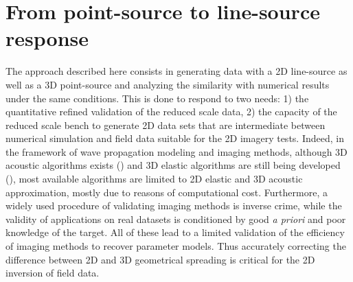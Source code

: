 \documentclass[extra,mreferee]{gji}
\newenvironment{violetnote}{\par\color{BlueViolet}}{\par}
\begin{document}
\begin{violetnote}
\section{From point-source to line-source response}

The approach described here consists in generating data with a 2D line-source as well as a 3D point-source and analyzing the similarity with numerical results under the same conditions. This is done to respond to two needs: 1) the quantitative refined validation of the reduced scale data, 2) the capacity of the reduced scale bench to generate 2D data sets that are intermediate between numerical simulation and field data suitable for the 2D imagery tests. Indeed, in the framework of wave propagation modeling and imaging methods, although 3D acoustic algorithms exists (\cite{benhadjali_FWI_2008,plessix_FWI_2010}) and 3D elastic algorithms are still being developed (\cite{castellanos_AMD_2011,Borisov_FWI_2015}), most available algorithms are limited to 2D elastic and 3D acoustic approximation, mostly due to reasons of computational cost. Furthermore, a widely used procedure of validating imaging methods is inverse crime, while the validity of applications on real datasets is conditioned by good \textit{a priori} and poor knowledge of the target. All of these lead to a limited validation of the efficiency of imaging methods to recover parameter models. Thus accurately correcting the difference between 2D and 3D geometrical spreading is critical for the 2D inversion of field data.


\end{violetnote}
\end{document}
